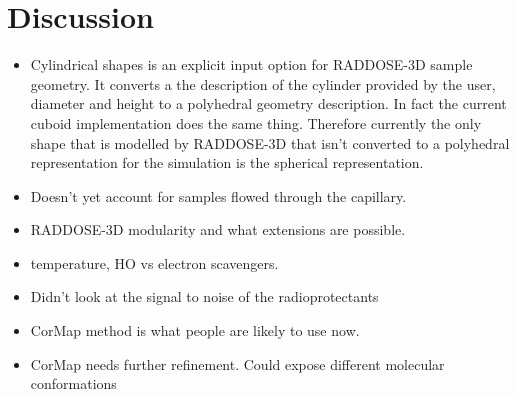 \section{Discussion}
\label{sec:Discussion}
\begin{itemize}
    \item Cylindrical shapes is an explicit input option for RADDOSE-3D sample geometry. It converts a the description of the cylinder provided by the user, diameter and height to a polyhedral geometry description. In fact the current cuboid implementation does the same thing. Therefore currently the only shape that is modelled by RADDOSE-3D that isn't converted to a polyhedral representation for the simulation is the spherical representation.
    \item Doesn't yet account for samples flowed through the capillary.
    \item RADDOSE-3D modularity and what extensions are possible.
    \item temperature, HO vs electron scavengers.
    \item Didn't look at the signal to noise of the radioprotectants
    \item CorMap method is what people are likely to use now.
    \item CorMap needs further refinement. Could expose different molecular conformations
\end{itemize}
